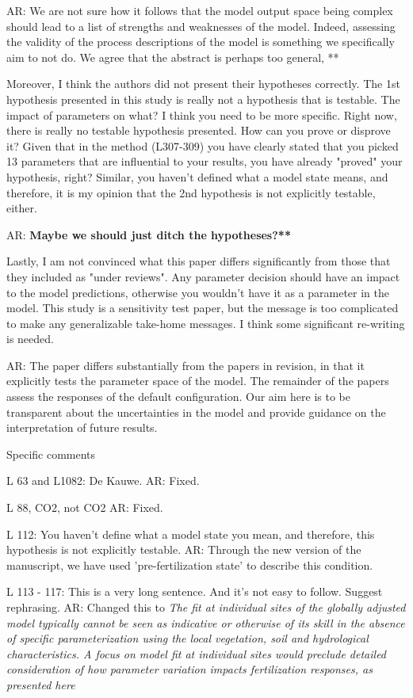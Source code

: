 \documentclass{article}
\begin{document}
{\textsf{AR: We are not sure how it follows that the model output space being complex should lead to a list of strengths and weaknesses of the model. Indeed, assessing the validity of the process descriptions of the model is something we specifically aim to not do. We agree that the abstract is perhaps too general, **}}

Moreover, I think the authors did not present their hypotheses correctly. The 1st hypothesis presented in this study is really not a hypothesis that is testable. The impact of parameters on what? I think you need to be more specific. Right now, there is really no testable hypothesis presented. How can you prove or disprove it? Given that in the method (L307-309) you have clearly stated that you picked 13 parameters that are influential to your results, you have already "proved" your hypothesis, right? Similar, you haven't defined what a model state means, and therefore, it is my opinion that the 2nd hypothesis is not explicitly testable, either. 

\textsf{AR: \textbf{Maybe we should just ditch the hypotheses?** }}

Lastly, I am not convinced what this paper differs significantly from those that they included as "under reviews". Any parameter decision should have an impact to the model predictions, otherwise you wouldn't have it as a parameter in the model. This study is a sensitivity test paper, but the message is too complicated to make any generalizable take-home messages. I think some significant re-writing is needed. 

\textsf{AR: The paper differs substantially from the papers in revision, in that it explicitly tests the parameter space of the model.  The remainder of the papers assess the responses of the default configuration. Our aim here is to be transparent about the uncertainties in the model and provide guidance on the interpretation of future results.} 

Specific comments 

L 63 and L1082: De Kauwe. 
\textsf{AR: Fixed.}

L 88, CO2, not CO2 
\textsf{AR: Fixed.}

L 112: You haven't define what a model state you mean, and therefore, this hypothesis is not explicitly testable. 
\textsf{AR: Through the new version of the manuscript, we have used 'pre-fertilization state' to describe this condition. }

L 113 - 117: This is a very long sentence. And it's not easy to follow. Suggest rephrasing.
\textsf{AR: Changed this to \emph{ The fit at individual sites of the globally adjusted model typically cannot be seen as indicative or otherwise of its skill in the absence of specific parameterization using the local vegetation, soil and hydrological characteristics. A focus on model fit at individual sites would preclude detailed consideration of how parameter variation impacts fertilization responses, as presented here}}
\end{document}

